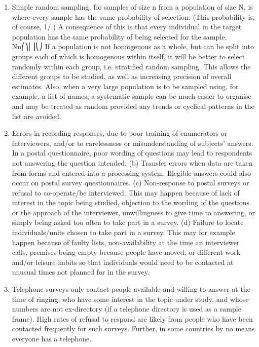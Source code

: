\documentclass[a4paper,12pt]{article}
\begin{document}
\begin{enumerate}
    \item  Simple random sampling, for samples of size n from a population of size N, is where every sample has the same probability of selection. (This probability is, of course, 1/.) A consequence of this is that every individual in the target population has the same probability of being selected for the sample. Nn⎛⎞⎜⎟⎝⎠
If a population is not homogenous as a whole, but can be split into groups each of which is homogenous within itself, it will be better to select randomly within each group, i.e. stratified random sampling. This allows the different groups to be studied, as well as increasing precision of overall estimates. Also, when a very large population is to be sampled using, for example, a list of names, a systematic sample can be much easier to organise and may be treated as random provided any trends or cyclical patterns in the list are avoided.
\item Errors in recording responses, due to poor training of enumerators or interviewers, and/or to carelessness or misunderstanding of subjects' answers. In a postal questionnaire, poor wording of questions may lead to respondents not answering the question intended.
(b) Transfer errors when data are taken from forms and entered into a processing system. Illegible answers could also occur on postal survey questionnaires.
(c) Non-response to postal surveys or refusal to co-operate/be interviewed. This may happen because of lack of interest in the topic being studied, objection to the wording of the questions or the approach of the interviewer, unwillingness to give time to answering, or simply being asked too often to take part in a survey.
(d) Failure to locate individuals/units chosen to take part in a survey. This may for example happen because of faulty lists, non-availability at the time an interviewer calls, premises being empty because people have moved, or different work and/or leisure habits so that individuals would need to be contacted at unusual times not planned for in the survey.
\item Telephone surveys only contact people available and willing to answer at the time of ringing, who have some interest in the topic under study, and whose numbers are not ex-directory (if a telephone directory is used as a sample frame). High rates of refusal to respond are likely from people who have been contacted frequently for such surveys. Further, in some countries by no means everyone has a telephone.

\end{enumerate}
\end{document}
